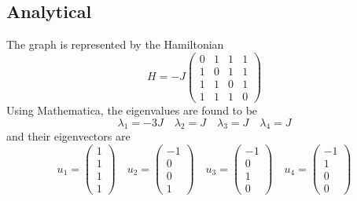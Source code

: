\documentclass[aps]{revtex4-2}
\begin{document}
\subsection{Analytical}
\noindent The graph is represented by the Hamiltonian
\begin{equation}
    H=-J\begin{pmatrix}
        0&1&1&1\\
        1&0&1&1\\
        1&1&0&1\\
        1&1&1&0
    \end{pmatrix}
\end{equation}
Using Mathematica, the eigenvalues are found to be
\begin{equation}
    \lambda_1=-3J\quad\lambda_2=J\quad\lambda_3=J\quad\lambda_4=J
\end{equation}
and their eigenvectors are
\begin{equation}
    u_1=\begin{pmatrix}
        1\\
        1\\
        1\\
        1
    \end{pmatrix}\quad u_2=\begin{pmatrix}
        -1\\
        0\\
        0\\
        1
    \end{pmatrix}\quad u_3=\begin{pmatrix}
        -1\\
        0\\
        1\\
        0
    \end{pmatrix}\quad u_4=\begin{pmatrix}
        -1\\
        1\\
        0\\
        0
    \end{pmatrix}
\end{equation}
\end{document}
